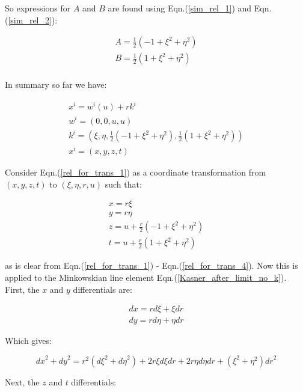 \noindent So expressions for $A$ and $B$ are found using Eqn.(\ref{sim_rel_1}) and Eqn.(\ref{sim_rel_2}):

\begin{eqnarray*}
A = \frac{1}{2} (-1 + \xi^2 + \eta^2) \\
B = \frac{1}{2} (1 + \xi^2 + \eta^2) \\
\end{eqnarray*}

In summary so far we have:

\begin{eqnarray}
x^i = w^i (u) + r k^i \label{rel_for_trans_1}\\
w^i = (0,0, u,u) \label{rel_for_trans_2}\\
k^i = (\xi, \eta, \frac{1}{2} (-1 + \xi^2 + \eta^2), \frac{1}{2} (1 + \xi^2 + \eta^2)) \label{rel_for_trans_3}\\
x^i = (x, y, z, t) \label{rel_for_trans_4}  
\end{eqnarray}

Consider Eqn.(\ref{rel_for_trans_1}) as a coordinate transformation from $(x,y,z,t)$ to $(\xi,\eta, r, u )$ such that:

\begin{eqnarray}
x = r \xi \nonumber \\
y = r \eta \nonumber \\
z = u + \frac{r}{2} (-1 + \xi^2 + \eta^2) \nonumber \\
t = u + \frac{r}{2} (1 + \xi^2 + \eta^2)  \label{trans_x_to_xi} 
\end{eqnarray} 

\noindent as is clear from Eqn.(\ref{rel_for_trans_1}) - Eqn.(\ref{rel_for_trans_4}). Now this is applied to the Minkowskian line element Eqn.(\ref{Kasner_after_limit_no_k}). First, the $x$ and $y$ differentials are:

\begin{eqnarray*} 
dx = r d\xi + \xi dr \\
dy = r d\eta + \eta dr 
\end{eqnarray*} 

\noindent Which gives:

\begin{equation}\label{differentials_1}
{dx}^2 + {dy}^2 = r^2 ({d\xi}^2 + {d\eta}^2) + 2 r \xi {d\xi} {dr} + 2 r \eta {d\eta}{dr} + (\xi^2 + \eta^2) {dr}^2
\end{equation}

\noindent Next, the $z$ and $t$ differentials:

